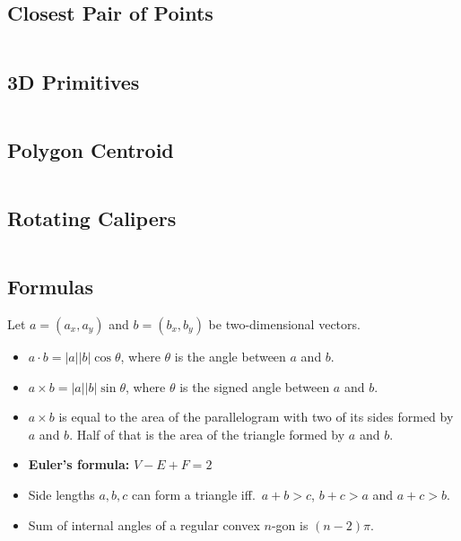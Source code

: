 \documentclass[9pt,a4paper,twocolumn,landscape,oneside]{amsart}
\newcommand{\code}[1]{\inputminted{cpp}{_code/#1}}
\newif\ifverbose
\begin{document}
    \subsection{Closest Pair of Points}
        \ifverbose
        A sweep line algorithm for computing the distance between the closest
        pair of points.
        \fi
        \code{geometry/closest_pair.cpp}

    \subsection{3D Primitives}
        \ifverbose
        Three-dimensional geometry primitives.
        \fi
        \code{geometry/primitives3d.cpp}

    \subsection{Polygon Centroid}
        \code{geometry/polygon_centroid.cpp}

    \subsection{Rotating Calipers}
        \code{geometry/rotating_calipers.cpp}

    \subsection{Formulas}
        Let $a = (a_x, a_y)$ and $b = (b_x, b_y)$ be two-dimensional vectors.
        \begin{itemize}
            \item $a\cdot b = |a||b|\cos{\theta}$, where $\theta$ is the angle
                between $a$ and $b$.
            \item $a\times b = |a||b|\sin{\theta}$, where $\theta$ is the
                signed angle between $a$ and $b$.
            \item $a\times b$ is equal to the area of the parallelogram with
                two of its sides formed by $a$ and $b$. Half of that is the
                area of the triangle formed by $a$ and $b$.
            \item \textbf{Euler's formula:} $V - E + F = 2$
            \item Side lengths $a,b,c$ can form a triangle iff.\ $a+b>c$, $b+c>a$ and $a+c>b$.
            \item Sum of internal angles of a regular convex $n$-gon is $(n-2)\pi$.
        \end{itemize}
\end{document}
